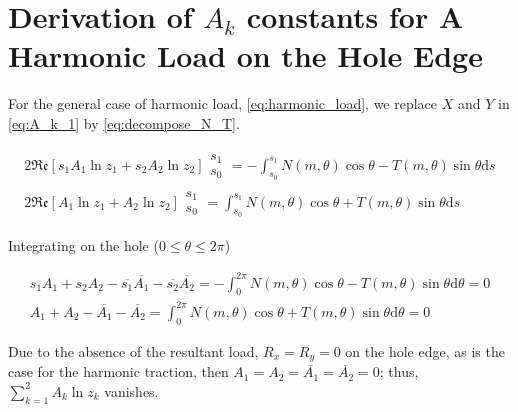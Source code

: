 \section{Derivation of \texorpdfstring{$A_k$}{} constants for A Harmonic Load on the Hole Edge} \label{app:remove_A_k}

For the general case of harmonic load, \cref{eq:harmonic_load}, we replace $X$ and $Y$ in \cref{eq:A_k_1} by \cref{eq:decompose_N_T}.

\begin{gather*}
    2 \mathfrak{Re}[s_1 A_1 \ln z_1 + s_2 A_2 \ln z_2]  \begin{matrix} s_1 \\ s_0 \end{matrix} = 
-\displaystyle\int_{s_0}^{s_1}{N(m, \theta) \cos\theta - T(m, \theta) \sin\theta} \mathrm{d}s \\
    2 \mathfrak{Re}[A_1 \ln z_1 + A_2 \ln z_2]     \begin{matrix}  s_1 \\ s_0 \end{matrix}
= \displaystyle\int_{s_0}^{s_1}{N(m, \theta) \cos\theta + T(m, \theta) \sin\theta}\mathrm{d}s
\end{gather*}

Integrating on the hole ($0 \leq \theta \leq 2\pi$)

\begin{gather*}
    s_1 A_1 + s_2 A_2 - \overline{s_1} \overline{A_1} - \overline{s_2} \overline{A_2} = -\displaystyle\int_{0}^{2\pi}{N(m, \theta) \cos\theta - T(m, \theta) \sin\theta} \mathrm{d}\theta = 0 \\
    A_1 + A_2 - \overline{A_1} - \overline{A_2} = \displaystyle\int_{0}^{2\pi}{N(m, \theta) \cos\theta + T(m, \theta) \sin\theta}\mathrm{d}\theta = 0
\end{gather*}

Due to the absence of the resultant load, $R_x = R_y = 0$ on the hole edge, as is the case for the harmonic traction, then $A_1 = A_2 = \overline{A_1} = \overline{A_2} = 0$; thus, $\displaystyle\sum_{k=1}^{2}{A_k \ln z_k}$ vanishes.